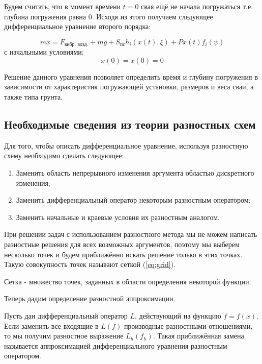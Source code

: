 \noindent Будем считать, что в момент времени $t = 0$ свая ещё не начала погружаться т.е. глубина погружения равна 0.
Исходя из этого получаем следующее дифференциальное уравнение второго порядка:

\begin{equation}
    \label{eq:main}
    m\ddot{x} = F_\text{вибр. возд.} + mg + S_\text{пс} h_i(x(t), \xi) + P x(t) f_i(\psi)
\end{equation}
с начальными условиями:
\begin{equation}
    x(0) = \dot{x}(0) = 0
\end{equation}

Решение данного уравнения позволяет определить время и глубину погружения в зависимости от характеристик погружающей
установки, размеров и веса сваи, а также типа грунта.

\subsection{Необходимые сведения из теории разностных схем}

Для того, чтобы описать дифференциальное уравнение, используя разностную схему необходимо сделать следующее:
\begin{enumerate}
    \item Заменить область непрерывного изменения аргумента областью дискретного изменения;
    \item Заменить дифференциальный оператор некоторым разностным оператором;
    \item Заменить начальные и краевые условия их разностным аналогом.
\end{enumerate}

При решении задач с использованием разностного метода мы не можем написать разностные решения для всех возможных аргументов,
поэтому мы выберем несколько точек и будем приближённо искать решение только в этих точках. Такую совокупность точек
называют сеткой (\ref{eq:grid}).

\begin{definition}
    \label{eq:grid}
    Сетка - множество точек, заданных в области определения некоторой функции.
\end{definition}

Теперь дадим определение разностной аппроксимации.

\begin{definition}
    Пусть дан дифференциальный оператор $L$, действующий на функцию $f = f(x)$. Если заменить все входящие в $L(f)$
    производные разностными отношениями, то мы получим разностное выражение $L_h(f_h)$. Такая приближённая замена называется
    аппроксимацией дифференциального уравнения разностным оператором.
\end{definition}


